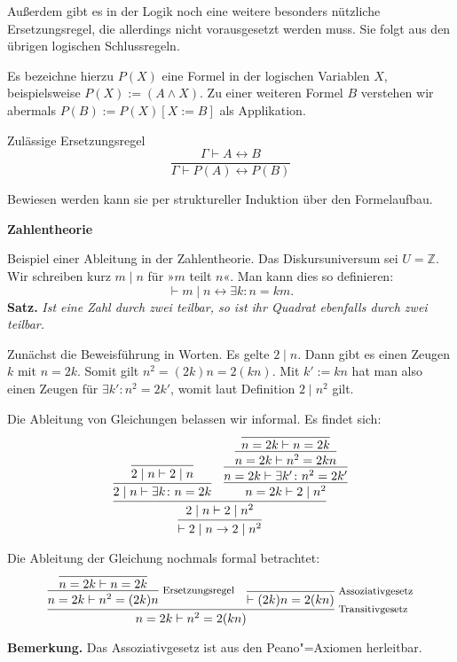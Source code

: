 \documentclass[8pt]{beamer}
\newcommand{\strong}[1]{\textsf{\textbf{#1}}}
\newcommand{\infernote}[1]{\!\text{\footnotesize #1}}
\newcommand{\centerheadline}[1]{%
  \begin{center}\strong{#1}\end{center}}
\newcommand{\parspace}{\vspace{0.8em}}
\newcommand{\cond}{\rightarrow}
\newcommand{\bicond}{\leftrightarrow}
\newcommand{\Z}{\mathbb Z}
\begin{document}
\begin{frame}
Außerdem gibt es in der Logik noch eine weitere besonders nützliche
Ersetzungsregel, die allerdings nicht vorausgesetzt werden muss.
Sie folgt aus den übrigen logischen Schlussregeln.

\parspace
Es bezeichne hierzu $P(X)$ eine Formel in der logischen Variablen $X$,
beispielsweise $P(X) := (A\land X)$. Zu einer weiteren Formel
$B$ verstehen wir abermals $P(B):=P(X)[X:=B]$ als Applikation.\pause

\begin{block}{Zulässige Ersetzungsregel}
\[\dfrac{\Gamma\vdash A\leftrightarrow B}{\Gamma\vdash P(A)\leftrightarrow P(B)}\]
\end{block}\pause
Bewiesen werden kann sie per struktureller Induktion über den
Formelaufbau.
\end{frame}

\begin{frame}
\centerheadline{Zahlentheorie}
\end{frame}

\begin{frame}
Beispiel einer Ableitung in der Zahlentheorie.
Das Diskursuniversum sei $U=\Z$. Wir schreiben kurz $m\mid n$
für »$m$ teilt $n$«. Man kann dies so definieren:
\[\vdash m\mid n\bicond\exists k\colon n=km.\]\pause
\strong{Satz.} \emph{Ist eine Zahl durch zwei teilbar, so
ist ihr Quadrat ebenfalls durch zwei teilbar.}\pause

\parspace
Zunächst die Beweisführung in Worten.
Es gelte $2\mid n$. Dann gibt es einen Zeugen $k$ mit $n=2k$.
Somit gilt $n^2 = (2k)n = 2(kn)$. Mit $k':=kn$ hat
man also einen Zeugen für $\exists k'\colon n^2=2k'$, womit
laut Definition $2\mid n^2$ gilt.\pause

\parspace
Die Ableitung von Gleichungen belassen wir informal.
Es findet sich:
\[
\infer{\vdash 2\mid n \cond 2\mid n^2}{
  \infer{2\mid n\vdash 2\mid n^2}{
    \infer{2\mid n\vdash\exists k\colon n=2k}{
      \infer{2\mid n\vdash 2\mid n}{}}
  & \infer{n=2k\vdash 2\mid n^2}{
      \infer{n=2k\vdash\exists k'\colon n^2=2k'}{
        \infer{n=2k\vdash n^2 = 2kn}{
          \infer{n=2k\vdash n=2k}{}}}}}}
\]
\end{frame}

\begin{frame}
Die Ableitung der Gleichung nochmals formal betrachtet:
\[
\infer[\infernote{Transitivgesetz}]{n=2k\vdash n^2 = 2(kn)}{
  \infer[\infernote{Ersetzungsregel}]{n=2k\vdash n^2 = (2k)n}{
    \infer{n=2k\vdash n=2k}{}
  }
& \infer[\infernote{Assoziativgesetz}]{\vdash (2k)n = 2(kn)}{}}
\]
\begin{footnotesize}
\strong{Bemerkung.} Das Assoziativgesetz ist aus den
Peano"=Axiomen herleitbar.
\end{footnotesize}
\end{frame}
\end{document}
